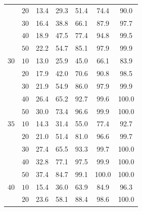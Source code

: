 \documentclass[empirical,issue, twocolumn,authordate]{jote-new-article}
\begin{document}
\begin{table}[t!]
\begin{fullwidth}
\begin{tabular}{@{}p{4\smallwidth} p{4\smallwidth} S  S  S  S  S @{}}
& $20$                                                              & 13.4      & 29.3     & 51.4     & 74.4      & 90.0      \\ 
        & $30$                                                              & 16.4      & 38.8     & 66.1     & 87.9      & 97.7      \\
& $40$                                                              & 18.9      & 47.5     & 77.4     & 94.8      & 99.5      \\
& $50$             & 22.2      & 54.7     & 85.1     & 97.9      & 99.9      \\
$30$                                                            & $10$                                                              & 13.0      & 25.9     & 45.0     & 66.1      & 83.9      \\
& $20$                                                              & 17.9      & 42.0     & 70.6     & 90.8      & 98.5      \\
& $30$                                                              & 21.9      &54.9     & 86.0     & 97.9      & 99.9      \\
& $40$                                                             & 26.4      & 65.2     & 92.7     & 99.6      & 100.0     \\
& $50$                                                              & 30.0      & 73.4     & 96.6     & 99.9      & 100.0     \\
$35$                                                            & $10 $                                                             & 14.3      & 31.4    & 55.0     & 77.4      & 92.7      \\
& $20$                                                              & 21.0      & 51.4     & 81.0     & 96.6      & 99.7      \\
& $30$                                                              & 27.4      & 65.5     & 93.3     & 99.7      & 100.0     \\
& $40$                                                              & 32.8      & 77.1     & 97.5     & 99.9      & 100.0     \\
    & $50$                                                              & 37.4      & 84.7     & 99.1     & 100.0     & 100.0     \\
$40$      & $10$                 & 15.4      & 36.0     & 63.9     & 84.9      & 96.3      \\
& $20$                                                              & 23.6      & 58.1     & 88.4     & 98.6      & 100.0     \\

\end{tabular}
\end{fullwidth}
\end{table}
\end{document}
